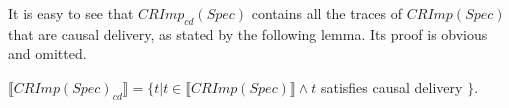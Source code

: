 It is easy to see that $CRImp_{cd}(Spec)$ contains all the traces of $CRImp(Spec)$ that are causal delivery, as stated by the following lemma. Its proof is obvious and omitted.

\begin{lemma}
\label{lemma:CRImpcdSpec contains all the traces of CRImpSpec that are causal delivery}

$\llbracket CRImp(Spec)_{cd} \rrbracket = \{ t \vert t \in \llbracket CRImp(Spec) \rrbracket \wedge t$ satisfies causal delivery $\}$.
\end{lemma}
























